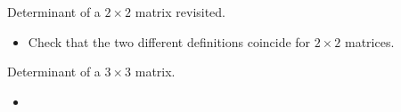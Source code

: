 \documentclass{beamer}
\begin{document}

\begin{frame}{Determinant of a $2\times 2$ matrix revisited.}

\begin{itemize}
\item Check that the two different definitions coincide for $2\times 2$ matrices.
\end{itemize}
\end{frame}


\begin{frame}{Determinant of a $3\times 3$ matrix.}

\begin{itemize}
\item
\end{itemize}
\end{frame}

\end{document}
